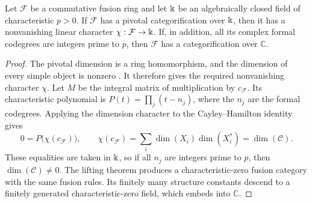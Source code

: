 \documentclass{amsart}
\begin{document}
\begin{theorem}  \label{thm:lift}
Let $\mathcal F$ be a commutative fusion ring and let $\Bbbk$ be an algebraically closed field of characteristic $p>0$. If $\mathcal F$ has a pivotal categorification over $\Bbbk$, then it has a nonvanishing linear character $\chi:\mathcal F\to\Bbbk$. If, in addition, all its complex formal codegrees are integers prime to $p$, then $\mathcal F$ has a categorification over $\mathbb C$.

\end{theorem}
\begin{proof}
The pivotal dimension is a ring homomorphism, and the dimension of every simple object is nonzero \cite[Propositions 4.7.12 and 4.8.4]{EGNO15}. It therefore gives the required nonvanishing character $\chi$. Let $M$ be the integral matrix of multiplication by $c_{\mathcal F}$. Its characteristic polynomial is $P(t)=\prod_j(t-n_j)$, where the $n_j$ are the formal codegrees. Applying the dimension character to the Cayley--Hamilton identity gives
\[
 0=P\bigl(\chi(c_{\mathcal F})\bigr),\qquad
 \chi(c_{\mathcal F})=\sum_i\dim(X_i)\dim(X_i^*)=\dim(\mathcal C).
\]
These equalities are taken in $\Bbbk$, so if all $n_j$ are integers prime to $p$, then $\dim(\mathcal C)\ne0$. The lifting theorem \cite[Theorem 9.16.1]{EGNO15} produces a characteristic-zero fusion category with the same fusion rules. Its finitely many structure constants descend to a finitely generated characteristic-zero field, which embeds into $\mathbb C$.

\end{proof}
\end{document}
